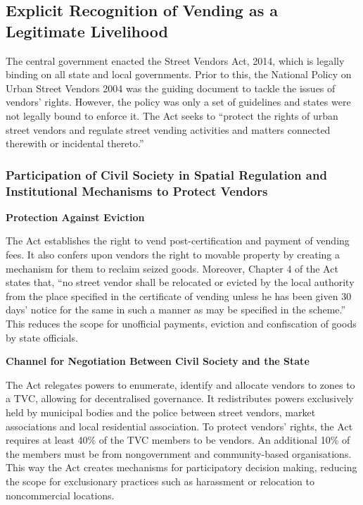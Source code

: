 \documentclass[a4paper, 12pt, twoside]{article}
\begin{document}
\subsection*{Explicit Recognition of Vending as a Legitimate Livelihood}

The central government enacted the Street Vendors Act, 2014, which is legally binding on all state and local governments. Prior to this, the National Policy on Urban Street Vendors 2004 was the guiding document to tackle the issues of vendors’ rights. However, the policy was only a set of guidelines and states were not legally bound to enforce it. The Act seeks to “protect the rights of urban street vendors and regulate street vending activities and matters connected therewith or incidental thereto.”

\subsubsection{Participation of Civil Society in Spatial Regulation and Institutional Mechanisms to Protect Vendors}

\textbf{Protection Against Eviction} 

The Act establishes the right to vend post-certification and payment of vending fees. It also confers upon vendors the right to movable property by creating a mechanism for them to reclaim seized goods. Moreover, Chapter 4 of the Act states that, “no street vendor shall be relocated or evicted by the local authority from the place specified in the certificate of vending unless he has been given 30 days’ notice for the same in such a manner as may be specified in the scheme.” This reduces the scope for unofficial payments, eviction and confiscation of goods by state officials. 

\textbf{Channel for Negotiation Between Civil Society and the State}

The Act relegates powers to enumerate, identify and allocate vendors to zones to a TVC, allowing for decentralised governance. It redistributes powers exclusively held by municipal bodies and the police between street vendors, market associations and local residential association. To protect vendors’ rights, the Act requires at least 40\% of the TVC members to be vendors. An additional 10\% of the members must be from nongovernment and community-based organisations. This way the Act creates mechanisms for participatory decision making, reducing the scope for exclusionary practices such as harassment or relocation to noncommercial locations.
\end{document}

